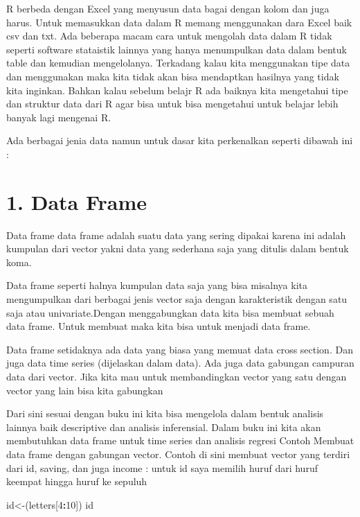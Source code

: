 \documentclass[
]{book}
\newenvironment{Shaded}{\begin{snugshade}}{\end{snugshade}}
\newcommand{\DecValTok}[1]{\textcolor[rgb]{0.00,0.00,0.81}{#1}}
\newcommand{\NormalTok}[1]{#1}
\newcommand{\OtherTok}[1]{\textcolor[rgb]{0.56,0.35,0.01}{#1}}
\newcommand{\SpecialCharTok}[1]{\textcolor[rgb]{0.81,0.36,0.00}{\textbf{#1}}}
\theoremstyle{definition}
\theoremstyle{definition}
\theoremstyle{definition}
\theoremstyle{definition}
\theoremstyle{remark}
\begin{document}
R berbeda dengan Excel yang menyusun data bagai dengan kolom dan juga harus. Untuk memasukkan data dalam R memang menggunakan dara Excel baik csv dan txt. Ada beberapa macam cara untuk mengolah data dalam R tidak seperti software stataistik lainnya yang hanya menumpulkan data dalam bentuk table dan kemudian mengelolanya.
Terkadang kalau kita menggunakan tipe data dan menggunakan maka kita tidak akan bisa mendaptkan hasilnya yang tidak kita inginkan. Bahkan kalau sebelum belajr R ada baiknya kita mengetahui tipe dan struktur data dari R agar bisa untuk bisa mengetahui untuk belajar lebih banyak lagi mengenai R.

Ada berbagai jenia data namun untuk dasar kita perkenalkan seperti dibawah ini :

\hypertarget{data-frame}{%
\section*{1. Data Frame}\label{data-frame}}

Data frame data frame adalah suatu data yang sering dipakai karena ini adalah kumpulan dari vector yakni data yang sederhana saja yang ditulis dalam bentuk koma.

Data frame seperti halnya kumpulan data saja yang bisa misalnya kita mengumpulkan dari berbagai jenis vector saja dengan karakteristik dengan satu saja atau univariate.Dengan menggabungkan data kita bisa membuat sebuah data frame. Untuk membuat maka kita bisa untuk menjadi data frame.

Data frame setidaknya ada data yang biasa yang memuat data cross section. Dan juga data time series (dijelaskan dalam data). Ada juga data gabungan campuran data dari vector. Jika kita mau untuk membandingkan vector yang satu dengan vector yang lain bisa kita gabungkan

Dari sini sesuai dengan buku ini kita bisa mengelola dalam bentuk analisis lainnya baik descriptive dan analisis inferensial. Dalam buku ini kita akan membutuhkan data frame untuk time series dan analisis regresi
Contoh Membuat data frame dengan gabungan vector. Contoh di sini membuat vector yang terdiri dari id, saving, dan juga income : untuk id saya memilih huruf dari huruf keempat hingga huruf ke sepuluh

\begin{Shaded}
\begin{Highlighting}[]
\NormalTok{id}\OtherTok{\textless{}{-}}\NormalTok{(letters[}\DecValTok{4}\SpecialCharTok{:}\DecValTok{10}\NormalTok{])}
\NormalTok{id}
\end{Highlighting}
\end{Shaded}
\end{document}
